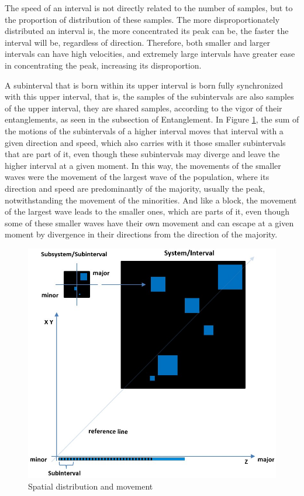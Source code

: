 The speed of an interval is not directly related to the number of samples, but to the proportion of distribution of these samples. The more disproportionately distributed an interval is, the more concentrated its peak can be, the faster the interval will be, regardless of direction. Therefore, both smaller and larger intervals can have high velocities, and extremely large intervals have greater ease in concentrating the peak, increasing its disproportion.

A subinterval that is born within its upper interval is born fully synchronized with this upper interval, that is, the samples of the subintervals are also samples of the upper interval, they are shared samples, according to the vigor of their entanglements, as seen in the subsection of Entanglement. In Figure \ref{fig:consciousness_space_plan}, the sum of the motions of the subintervals of a higher interval moves that interval with a given direction and speed, which also carries with it those smaller subintervals that are part of it, even though these subintervals may diverge and leave the higher interval at a given moment. In this way, the movements of the smaller waves were the movement of the largest wave of the population, where its direction and speed are predominantly of the majority, usually the peak, notwithstanding the movement of the minorities. And like a block, the movement of the largest wave leads to the smaller ones, which are parts of it, even though some of these smaller waves have their own movement and can escape at a given moment by divergence in their directions from the direction of the majority.
	\begin{figure}[H]
	\caption{Spatial distribution and movement}
	\label{fig:consciousness_space_plan}
	\centering
	\includegraphics[scale=.6]{sections/images/consciousness_space_plan.jpg}
	\end{figure}

